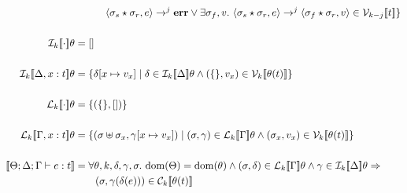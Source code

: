 \documentclass[11pt]{article}%
\newcommand{\den}[3]{ \mathcal{#1}_{#2} [\![ #3 ]\!] }%
\newcommand{\V}[2]{ \den{V}{#1}{#2} }%
\newcommand{\C}[2]{ \den{C}{#1}{#2} }%
\newcommand{\dom}{\mathrm{dom}}%
\newcommand{\empH}{\{\}}%
\begin{document}
\begin{align*}
               & \qquad \quad \langle \sigma_s \star \sigma_r, e \rangle \rightarrow^j \ottkw{err} \vee \exists \sigma_f, v.\ \langle \sigma_s \star \sigma_r, e \rangle \rightarrow^j \langle \sigma_f \star \sigma_r, v \rangle \in \V{k-j}{t} \} \\
\\
        \den{I}{k}{ \cdot } \theta &= [ ] \\
\\
    \den{I}{k}{ \Delta, x : t } \theta &= \{ \delta[x \mapsto v_x ] \mid \delta \in \den{I}{k}{\Delta}\theta \wedge (\{\}, v_x) \in \V{k}{\theta(t)} \} \\
\\
    \den{L}{k}{ \cdot } \theta &= \{ (\empH, []) \} \\
\\
    \den{L}{k}{ \Gamma, x : t } \theta &= \{ (\sigma \uplus \sigma_x, \gamma[x \mapsto v_x ]) \mid (\sigma, \gamma) \in \den{L}{k}{\Gamma}\theta \wedge (\sigma_x, v_x) \in \V{k}{\theta(t)} \} \\
\\
\den{}{}{ \Theta; \Delta ; \Gamma \vdash e : t } &= \forall \theta, k, \delta, \gamma, \sigma.\ \dom(\Theta) = \dom(\theta) \wedge (\sigma, \delta) \in \den{L}{k}{ \Gamma }\theta \wedge \gamma \in \den{I}{k}{ \Delta }\theta \Rightarrow \\
                                                 & \qquad (\sigma, \gamma(\delta(e))) \in \C{k}{ \theta(t) }
\end{align*}
\end{document}
